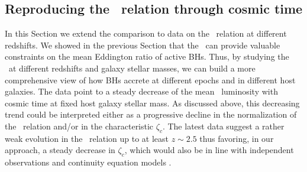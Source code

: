

\subsection{Reproducing the \LXMS\ relation through cosmic time}

In this Section we extend the comparison to data on the \LXMS\ relation at different redshifts. We showed in the previous Section that the \LX\ can provide valuable constraints on the mean Eddington ratio of active BHs. Thus, by studying the \LXMS\ at different redshifts and galaxy stellar masses, we can build a more comprehensive view of how BHs accrete at different epochs and in different host galaxies.
The data point to a steady decrease of the mean \LXMS\ luminosity with cosmic time at fixed host galaxy stellar mass. As discussed above, this decreasing trend could be interpreted either as a progressive decline in the normalization of the \MBHMS\ relation and/or in the characteristic $\zeta_c$. The latest data suggest a rather weak evolution in the \MBHMS\ relation up to at least $z\sim 2.5$ \citep[e.g.,][]{Suh20,Shankar20MNRAS} thus favoring, in our approach, a steady decrease in $\zeta_c$, which would also be in line with independent observations \citep[]{Kollmeier06} and continuity equation models \citep[][]{Shankar13Acc,Aversa15}.

